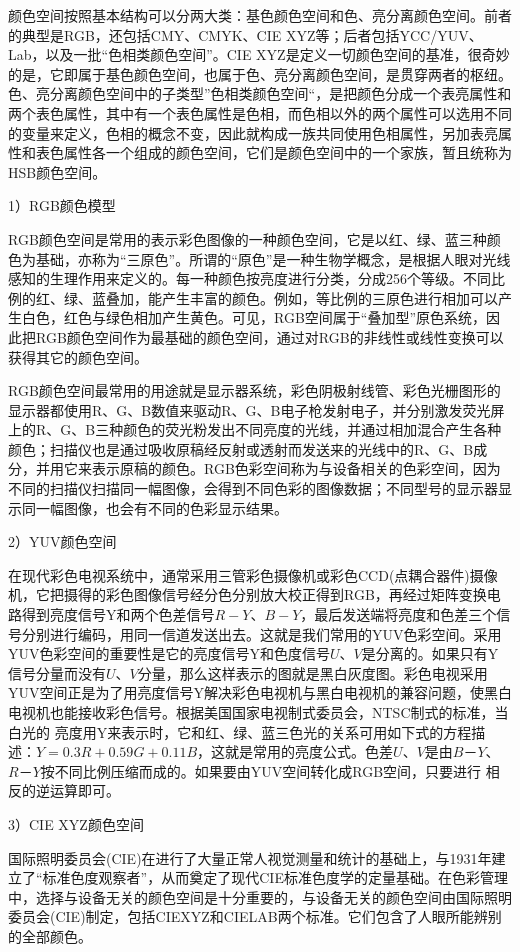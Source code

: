 \documentclass[12pt]{article}
\begin{document}
颜色空间按照基本结构可以分两大类：基色颜色空间和色、亮分离颜色空间。前者的典型是RGB，还包括CMY、CMYK、CIE XYZ等；后者包括YCC/YUV、Lab，以及一批“色相类颜色空间”。CIE XYZ是定义一切颜色空间的基准，很奇妙的是，它即属于基色颜色空间，也属于色、亮分离颜色空间，是贯穿两者的枢纽。色、亮分离颜色空间中的子类型”色相类颜色空间“，是把颜色分成一个表亮属性和两个表色属性，其中有一个表色属性是色相，而色相以外的两个属性可以选用不同的变量来定义，色相的概念不变，因此就构成一族共同使用色相属性，另加表亮属性和表色属性各一个组成的颜色空间，它们是颜色空间中的一个家族，暂且统称为HSB颜色空间。

1）RGB颜色模型

RGB颜色空间是常用的表示彩色图像的一种颜色空间，它是以红、绿、蓝三种颜色为基础，亦称为“三原色”。所谓的“原色”是一种生物学概念，是根据人眼对光线感知的生理作用来定义的。每一种颜色按亮度进行分类，分成256个等级。不同比例的红、绿、蓝叠加，能产生丰富的颜色。例如，等比例的三原色进行相加可以产生白色，红色与绿色相加产生黄色。可见，RGB空间属于“叠加型”原色系统，因此把RGB颜色空间作为最基础的颜色空间，通过对RGB的非线性或线性变换可以获得其它的颜色空间。

RGB颜色空间最常用的用途就是显示器系统，彩色阴极射线管、彩色光栅图形的显示器都使用R、G、B数值来驱动R、G、B电子枪发射电子，并分别激发荧光屏上的R、G、B三种颜色的荧光粉发出不同亮度的光线，并通过相加混合产生各种颜色；扫描仪也是通过吸收原稿经反射或透射而发送来的光线中的R、G、B成分，并用它来表示原稿的颜色。RGB色彩空间称为与设备相关的色彩空间，因为不同的扫描仪扫描同一幅图像，会得到不同色彩的图像数据；不同型号的显示器显示同一幅图像，也会有不同的色彩显示结果。

2）YUV颜色空间

在现代彩色电视系统中，通常采用三管彩色摄像机或彩色CCD(点耦合器件)摄像机，它把摄得的彩色图像信号经分色分别放大校正得到RGB，再经过矩阵变换电路得到亮度信号Y和两个色差信号$R-Y$、$B-Y$，最后发送端将亮度和色差三个信号分别进行编码，用同一信道发送出去。这就是我们常用的YUV色彩空间。采用YUV色彩空间的重要性是它的亮度信号Y和色度信号$U$、$V$是分离的。如果只有Y信号分量而没有$U$、$V$分量，那么这样表示的图就是黑白灰度图。彩色电视采用YUV空间正是为了用亮度信号Y解决彩色电视机与黑白电视机的兼容问题，使黑白电视机也能接收彩色信号。根据美国国家电视制式委员会，NTSC制式的标准，当白光的 亮度用Y来表示时，它和红、绿、蓝三色光的关系可用如下式的方程描述：$Y=0.3R+0.59G+0.11B$，这就是常用的亮度公式。色差$U$、$V$是由$B－Y$、$R－Y$按不同比例压缩而成的。如果要由YUV空间转化成RGB空间，只要进行 相反的逆运算即可。

3）CIE XYZ颜色空间

国际照明委员会(CIE)在进行了大量正常人视觉测量和统计的基础上，与1931年建立了“标准色度观察者”，从而奠定了现代CIE标准色度学的定量基础。在色彩管理中，选择与设备无关的颜色空间是十分重要的，与设备无关的颜色空间由国际照明委员会(CIE)制定，包括CIEXYZ和CIELAB两个标准。它们包含了人眼所能辨别的全部颜色。
\end{document}
